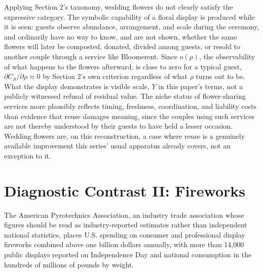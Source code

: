 \documentclass[11pt]{article}
\begin{document}
Applying Section 2's taxonomy, wedding flowers do not clearly satisfy the expressive category. The symbolic capability of a floral display is produced while it is seen: guests observe abundance, arrangement, and scale during the ceremony, and ordinarily have no way to know, and are not shown, whether the same flowers will later be composted, donated, divided among guests, or resold to another couple through a service like Bloomerent. Since $o(\rho)$, the observability of what happens to the flowers afterward, is close to zero for a typical guest, $\partial C_S/\partial \rho \approx 0$ by Section 2's own criterion regardless of what $\rho$ turns out to be. What the display demonstrates is visible scale, $Y$ in this paper's terms, not a publicly witnessed refusal of residual value. The niche status of flower-sharing services more plausibly reflects timing, freshness, coordination, and liability costs than evidence that reuse damages meaning, since the couples using such services are not thereby understood by their guests to have held a lesser occasion. Wedding flowers are, on this reconstruction, a case where reuse is a genuinely available improvement this series' usual apparatus already covers, not an exception to it.

\section{Diagnostic Contrast II: Fireworks}

The American Pyrotechnics Association, an industry trade association whose figures should be read as industry-reported estimates rather than independent national statistics, places U.S. spending on consumer and professional display fireworks combined above one billion dollars annually, with more than 14{,}000 public displays reported on Independence Day and national consumption in the hundreds of millions of pounds by weight.
\end{document}
